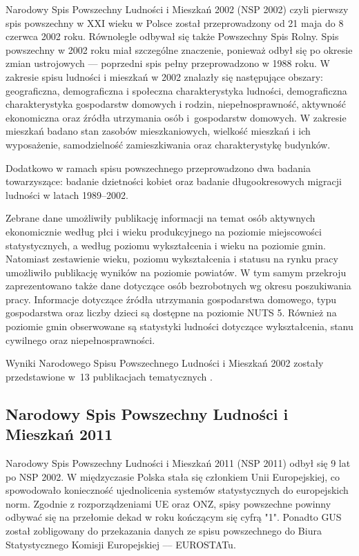 Narodowy Spis Powszechny Ludności i Mieszkań 2002 (NSP 2002) czyli pierwszy spis powszechny w XXI wieku w Polsce został przeprowadzony od 21 maja do 8 czerwca 2002 roku. Równolegle odbywał się także Powszechny Spis Rolny. Spis powszechny w 2002 roku miał szczególne znaczenie, ponieważ odbył się po okresie zmian ustrojowych --- poprzedni spis pełny przeprowadzono w 1988 roku. W zakresie spisu ludności i mieszkań w 2002 znalazły się następujące obszary: geograficzna, demograficzna i społeczna charakterystyka ludności, demograficzna charakterystyka gospodarstw domowych i rodzin, niepełnosprawność, aktywność ekonomiczna oraz źródła utrzymania osób i~gospodarstw domowych. W zakresie mieszkań badano stan zasobów mieszkaniowych, wielkość mieszkań i ich wyposażenie, samodzielność zamieszkiwania oraz charakterystykę budynków. 

Dodatkowo w ramach spisu powszechnego przeprowadzono dwa badania towarzyszące: badanie dzietności kobiet oraz badanie długookresowych migracji ludności w latach 1989--2002.

Zebrane dane umożliwiły publikację informacji na temat osób aktywnych ekonomicznie według płci i wieku produkcyjnego na poziomie miejscowości statystycznych, a według poziomu wykształcenia i wieku na poziomie gmin. Natomiast zestawienie wieku, poziomu wykształcenia i statusu na rynku pracy umożliwiło publikację wyników na poziomie powiatów. W tym samym przekroju zaprezentowano także dane dotyczące osób bezrobotnych wg okresu poszukiwania pracy. Informacje dotyczące źródła utrzymania gospodarstwa domowego, typu gospodarstwa oraz liczby dzieci są dostępne na poziomie NUTS 5. Również na poziomie gmin obserwowane są statystyki ludności dotyczące wykształcenia, stanu cywilnego oraz niepełnosprawności. 

Wyniki Narodowego Spisu Powszechnego Ludności i Mieszkań 2002 zostały przedstawione w~13 publikacjach tematycznych \citep{gus2003}.

\subsection{Narodowy Spis Powszechny Ludności i Mieszkań 2011}

Narodowy Spis Powszechny Ludności i Mieszkań 2011 (NSP 2011) odbył się 9 lat po NSP 2002. W międzyczasie Polska stała się członkiem Unii Europejskiej, co spowodowało konieczność ujednolicenia systemów statystycznych do europejskich norm. Zgodnie z rozporządzeniami UE oraz ONZ, spisy powszechne powinny odbywać się na przełomie dekad w roku kończącym się cyfrą "1". Ponadto GUS został zobligowany do przekazania danych ze spisu powszechnego do Biura Statystycznego Komisji Europejskiej –-- EUROSTATu. 

